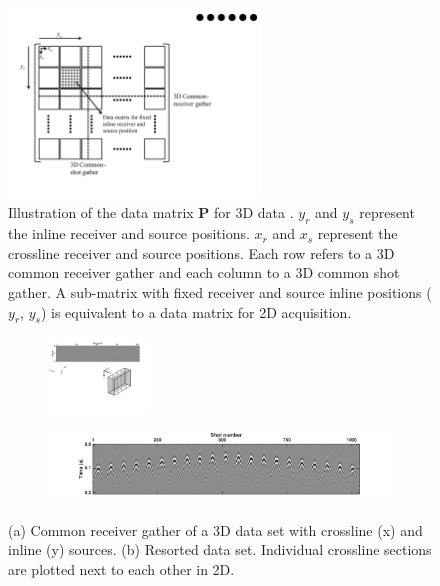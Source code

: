 \begin{figure}
	\centering
	\includegraphics[width=0.6\textwidth]{Plots/DelphiFormat-v2}
	\caption{Illustration of the data matrix $\mathbf{P}$ for 3D data \citep{Delphi-Format}. $y_r$ and $y_s$ represent the inline receiver and source positions. $x_r$ and $x_s$ represent the crossline receiver and source positions. Each row refers to a 3D common receiver gather and each column to a 3D common shot gather. A sub-matrix with fixed receiver and source inline positions ($y_r$, $y_s$) is equivalent to a data matrix for 2D acquisition.}
	\label{fig:Ch-Theory-DelphiFormat}
\end{figure}


\begin{figure}
	
	\begin{subfigure}[t]{\textwidth}
	 	\centering
		\includegraphics[width = 0.3\textwidth]{Plots/data3d}
		\caption{}
		\label{fig:Ch-Theory-Data3d}
	\end{subfigure}
	\par\bigskip
	\begin{subfigure}[t]{\textwidth}
		\centering
		\includegraphics[width = \textwidth]{Plots/data3d_Delphi}
		\caption{}
		\label{fig:Ch-Theory-Data3d_Delphi}
	\end{subfigure}
	
	\caption{(a) Common receiver gather of a 3D data set with crossline (x) and inline (y) sources. (b) Resorted data set. Individual crossline sections are plotted next to each other in 2D.}
	\label{fig:Ch-Theory-DataSorting}
\end{figure}


